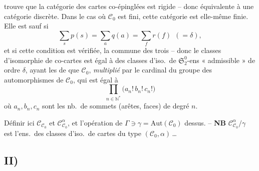 \documentclass[11pt,a4paper]{article}
\begin{document}
trouve que la catégorie des cartes  co-épinglées est rigide --
donc équivalente à une catégorie discrète.  Dans le cas où
$\mathcal{C}_{0}$ est fini, cette catégorie est elle-même finie. Elle est
 sauf si
\[
  \sum_{s} p(s) = \sum_{a} q(a) = \sum_{f} r(f)\ \ (= \delta),
\]
et si cette condition est vérifiée,  \struck{\ill{}} la
 \struck{\ill{}} commune des \struck{\ill{}}
trois -- donc le  
classes d'isomorphie de co-cartes est égal à  des classes
d'iso.\ de $\mathfrak{S}_{2}^{0}$-ens 
« admissible » de ordre $\delta$, ayant les \ill{} \struck{\ill{}}
 de  que $\mathcal{C}_{0}$,
\emph{multiplié} par le cardinal du groupe des automorphismes de
$\mathcal{C}_{0}$, qui est égal à
\[
  \prod_{n \in \mathbb{N}^{*}} \bigl(a_{n}!\, b_{n}!\, c_{n}!\bigr)
\]
où $a_{n}, b_{n}, c_{n}$ sont les nb.\ de sommets (arêtes, faces) de degré
$n$.

\marginal{//}
Définir ici $\mathcal{C}_{\mathcal{C}_{0}}$ et
$\mathcal{C}_{\mathcal{C}_{0}}^{\alpha}$, et l'opération de
$\Gamma \ni \gamma = \mathrm{Aut}(\mathcal{C}_{0})$ dessus. -- \textbf{NB}
$\mathcal{C}_{\mathcal{C}_{0}}^{\alpha}/\gamma$ est l'ens.\ des classes
d'iso.\ de cartes du type $(\mathcal{C}_{0}, \alpha)$\,…

\subsection*{II)}
\end{document}
